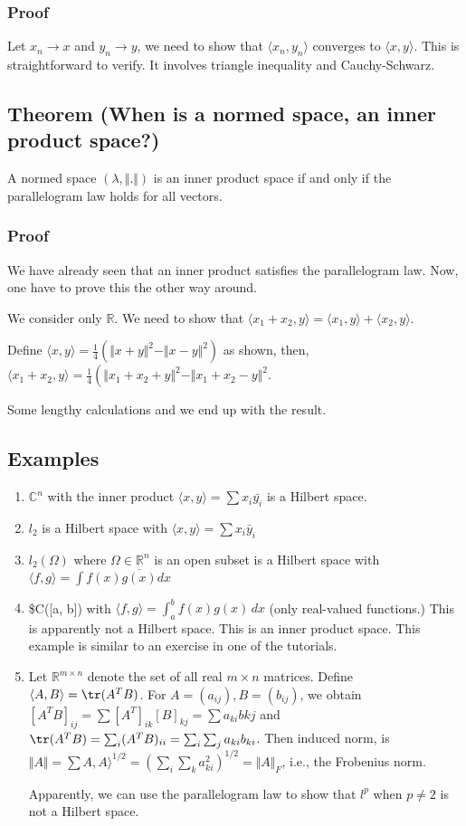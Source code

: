 \documentclass[11pt]{article}
\def\R{\mathbb{R}}
\def\C{\mathbb{C}}
\begin{document}
\subsubsection{Proof}
\label{sec:org1428b88}
Let \(x_n \rightarrow x\) and \(y_n \rightarrow y\), we need to show that
\(\langle x_n, y_n \rangle\) converges to \(\langle x, y \rangle\). This is
straightforward to verify. It involves triangle inequality and
Cauchy-Schwarz.
\subsection{Theorem (When is a normed space, an inner product space?)}
\label{sec:orge2a839a}
A normed space \((\lambda, \Vert . \Vert)\) is an inner product space if and
only if the parallelogram law holds for all vectors.
\subsubsection{Proof}
\label{sec:orgb8817b9}
We have already seen that an inner product satisfies the parallelogram law.
Now, one have to prove this the other way around.

We consider only \(\R\). We need to show that \(\langle x_1 + x_2, y \rangle =
    \langle x_1, y \rangle + \langle x_2, y \rangle\).

Define \(\langle x, y \rangle = \frac{1}{4}(\Vert x + y \Vert^2 - \Vert x-
    y\Vert^2)\) as shown, then, \(\langle x_1 + x_2, y \rangle =
    \frac{1}{4}\left(\Vert x_1 + x_2 + y \Vert^2 - \Vert x_1 +x_2 - y \Vert^2\).

Some lengthy calculations and we end up with the result.
\subsection{Examples}
\label{sec:org285a12d}
\begin{enumerate}
\item \(\C^n\) with the inner product \(\langle x, y \rangle = \sum x_i \bar{y_i}\)
is a Hilbert space.
\item \(l_2\) is a Hilbert space with \(\langle x, y \rangle = \sum x_i \bar{y}_i\)
\item \(l_2(\Omega)\) where \(\Omega \in \R^n\) is an open subset is a Hilbert space
with \(\langle f, g \rangle = \int f(x)\overline{g(x)} dx\)
\item \$C([a, b]) with \(\langle f, g \rangle = \int_{a}^{b} f(x)g(x)\, dx\) (only
real-valued functions.) This is apparently not a Hilbert space. This is an
inner product space. This example is similar to an exercise in one of the
tutorials.
\item Let \(\R^{m\times n}\) denote the set of all real \(m\times n\) matrices.
Define \(\langle A, B\rangle = \tr(A^TB)\). For \(A = (a_{ij}), B= (b_{ij})\),
we obtain \([A^TB]_{ij} = \sum [A^T]_{ik} [B]_{kj} = \sum a_{ki}b{kj}\) and
\(\tr(A^TB) = \sum_{i}(A^TB)_{ii} = \sum_i\sum_j a_{ki}b_{ki}\). Then
induced norm, is \(\Vert A \Vert = \sum A, A\rangle^{1/2} = \left(\sum_i
      \sum_k a_{ki}^2\right)^{1/2} = \Vert A \Vert_F\), i.e., the Frobenius norm.

Apparently, we can use the parallelogram law to show that \(l^p\) when
\(p\neq 2\) is not a Hilbert space.
\end{enumerate}
\end{document}
